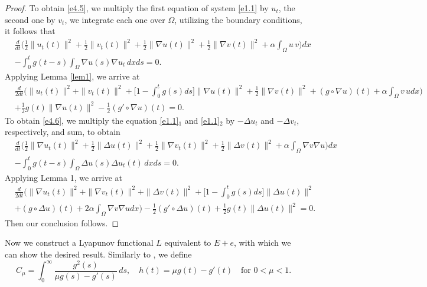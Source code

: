 \documentclass[reqno]{amsart}
\begin{document}
\begin{proof}
To obtain \eqref{e4.5}, we multiply the first equation of system \eqref{e1.1} by
$u_{t}$, the second one by $v_{t}$, we integrate each one over $\Omega$, utilizing
the boundary conditions, it follows that
\begin{align*}
&\frac{d}{dt} \Big( \frac{1}{2} \| u_{t}(t) \|^2 +\frac{1}{2} \| v_{t}(t) \|^2
+\frac{1}{2} \| \nabla u(t) \|^2 +\frac{1}{2} \| \nabla v(t) \|^2
 + \alpha \int_{\Omega} u\,v \Big) dx\\
&- \int_0^t g(t-s) \int_{\Omega} \nabla u(s) \nabla u_{t} \, dx ds =0.
\end{align*}
Applying Lemma \ref{lem1}, we arrive at
 \begin{align*}
&\frac{d}{2dt} \Big( \| u_{t}(t) \|^2 +\| v_{t}(t) \|^2
 + \Big[ 1-\int_0^t g(s) ds \Big] \| \nabla u(t) \|^2
 +\frac{1}{2} \| \nabla v(t) \|^2+ (g\circ \nabla u)(t)
 +\alpha \int_{\Omega} v \, u dx \Big) \\
& +\frac{1}{2} g(t)\parallel \nabla u(t) \parallel^2
- \frac{1}{2}( g'\circ\nabla u) (t) =0.
 \end{align*}
 To obtain \eqref{e4.6}, we multiply the equation \eqref{e1.1}$_1$ and
 \eqref{e1.1}$_2$ by $-\Delta u_t$ and $-\Delta v_t$, respectively,
and sum, to obtain
 \begin{align*}
&\frac{d}{dt}  \Big( \frac{1}{2} \| \nabla u_{t}(t) \|^2 + \frac{1}{2} \| \Delta u(t) \|^2 + \frac{1}{2}\| \nabla v_{t}(t) \|^2+ \frac{1}{2} \| \Delta v(t) \|^2 + \alpha \int_{\Omega} \nabla v \nabla u \Big) dx \\ 
& - \int_0^t g(t-s) \int_{\Omega} \Delta u(s) \Delta u_{t}(t) \, dx ds =0.
 \end{align*}
 Applying Lemma 1, we arrive at
\begin{align*}
&\frac{d}{2dt} \Big( \| \nabla u_t(t) \|^2+\| \nabla v_t(t) \|^2
+ \| \Delta v(t) \|^2 +\Big[ 1- \int_0^t g(s) ds \Big] \| \Delta u(t) \|^2 \\
& + (g \circ \Delta u)(t)+ 2 \alpha \int_{\Omega}\nabla v \nabla u dx\Big)
-\frac{1}{2}(g' \circ \Delta u)(t)+\frac{1}{2} g(t) \| \Delta u(t) \|^2=0.
\end{align*}
Then our conclusion follows.
\end{proof}

Now we construct a Lyapunov functional $L$ equivalent to $E+e$, with which we can
show the desired result.
Similarly to \cite{JKJT}, we define
\[
 C_\mu = \int_0^{\infty} \frac{g^2(s)}{\mu g(s) - g'(s)} \, ds, \quad
 h(t) = \mu g(t) - g'(t)\quad
 \text{for } 0<\mu <1.
\]
\end{document}
